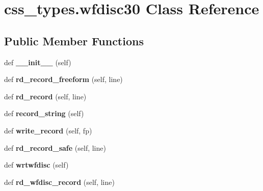 \hypertarget{classcss__types_1_1wfdisc30}{}\section{css\+\_\+types.\+wfdisc30 Class Reference}
\label{classcss__types_1_1wfdisc30}
\subsection*{Public Member Functions}
\begin{DoxyCompactItemize}
\item 
\hypertarget{classcss__types_1_1wfdisc30_ad88beea3ec068f8f6b57a72db27e3d9d}{}def {\bfseries \+\_\+\+\_\+init\+\_\+\+\_\+} (self)\label{classcss__types_1_1wfdisc30_ad88beea3ec068f8f6b57a72db27e3d9d}

\item 
\hypertarget{classcss__types_1_1wfdisc30_a943b18caa4918176bfbd659d3d78906d}{}def {\bfseries rd\+\_\+record\+\_\+freeform} (self, line)\label{classcss__types_1_1wfdisc30_a943b18caa4918176bfbd659d3d78906d}

\item 
\hypertarget{classcss__types_1_1wfdisc30_adbe24ad747943390c1632a910951ddf4}{}def {\bfseries rd\+\_\+record} (self, line)\label{classcss__types_1_1wfdisc30_adbe24ad747943390c1632a910951ddf4}

\item 
\hypertarget{classcss__types_1_1wfdisc30_a63c1daa4fc5635e8853fb744458a7108}{}def {\bfseries record\+\_\+string} (self)\label{classcss__types_1_1wfdisc30_a63c1daa4fc5635e8853fb744458a7108}

\item 
\hypertarget{classcss__types_1_1wfdisc30_a64b58d516529315976b62d28f6222844}{}def {\bfseries write\+\_\+record} (self, fp)\label{classcss__types_1_1wfdisc30_a64b58d516529315976b62d28f6222844}

\item 
\hypertarget{classcss__types_1_1wfdisc30_a63bac73658fdbd07296a8a3af35f011a}{}def {\bfseries rd\+\_\+record\+\_\+safe} (self, line)\label{classcss__types_1_1wfdisc30_a63bac73658fdbd07296a8a3af35f011a}

\item 
\hypertarget{classcss__types_1_1wfdisc30_a93342d4c61acfc4d29738aac6253a184}{}def {\bfseries wrtwfdisc} (self)\label{classcss__types_1_1wfdisc30_a93342d4c61acfc4d29738aac6253a184}

\item 
\hypertarget{classcss__types_1_1wfdisc30_a87cae7a421e15a3636b748296420b2bf}{}def {\bfseries rd\+\_\+wfdisc\+\_\+record} (self, line)\label{classcss__types_1_1wfdisc30_a87cae7a421e15a3636b748296420b2bf}

\end{DoxyCompactItemize}

